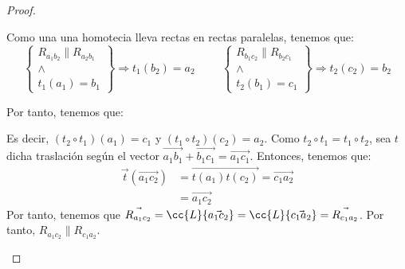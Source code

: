 \begin{proof}
\begin{enumerate}
        Como una una homotecia lleva rectas en rectas paralelas, tenemos que:
        \begin{equation*}
            \left\{
                \begin{array}{c}
                    R_{a_1b_2} \| R_{a_2b_1} \\
                    \land \\
                    t_1(a_1) = b_1
                \end{array}
            \right\} \Longrightarrow t_1(b_2)=a_2
            \hspace{1cm}
            \left\{
                \begin{array}{c}
                    R_{b_1c_2} \| R_{b_2c_1} \\
                    \land \\
                    t_2(b_1) = c_1
                \end{array}
            \right\} \Longrightarrow t_2(c_2)=b_2
        \end{equation*}

        Por tanto, tenemos que:
        \begin{figure}[H]
            \centering
        \end{figure}
        Es decir, $(t_2\circ t_1)(a_1)=c_1$ y $(t_1\circ t_2)(c_2)=a_2$. Como $t_2\circ t_1=t_1\circ t_2$, sea $t$ dicha traslación según el vector $\vec{a_1b_1}+\vec{b_1c_1}=\vec{a_1c_1}$. Entonces, tenemos que:
        \begin{equation*}
            \begin{split}
                \vec{t}(\vec{a_1c_2}) &= \vec{t(a_1)t(c_2)} = \vec{c_1a_2} \\
                &= \vec{a_1c_2}
            \end{split} 
        \end{equation*}
        Por tanto, tenemos que $\vec{R_{a_1c_2}} = \cc{L}\{\vec{a_1c_2}\} = \cc{L}\{\vec{c_1a_2}\} = \vec{R_{c_1a_2}}$. Por tanto, $R_{a_1c_2}\| R_{c_1a_2}$.\qedhere
    \end{enumerate}
\end{proof}

